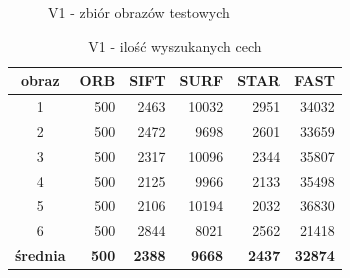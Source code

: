 \begin{figure}[!htb]
\begin{center}
{}
\caption{V1 - zbiór obrazów testowych}
\label{fig:v1_set}
\end{center}
\end{figure}



\begin{table}[htbp]
  \centering
  \caption{V1 - ilość wyszukanych cech}
    \begin{tabular}{|c|r|r|r|r|r|}\hline
    
    obraz & \textbf{ORB} & \textbf{SIFT} & \textbf{SURF} & \textbf{STAR} & \textbf{FAST} \\\hline
    
  
    1 & 500 & 2463 & 10032 & 2951 & 34032 \\
    2 & 500 & 2472 & 9698 & 2601 & 33659 \\
    3 & 500 & 2317 & 10096 & 2344 & 35807 \\
    4 & 500 & 2125 & 9966 & 2133 & 35498 \\
    5 & 500 & 2106 & 10194 & 2032 & 36830 \\
    6 & 500 & 2844 & 8021 & 2562 & 21418 \\\hline
    \textbf{średnia} & \textbf{500} & \textbf{2388} & \textbf{9668} & \textbf{2437} & \textbf{32874} \\
    \hline
    \end{tabular}%
  \label{tab:v1_f1}%
\end{table}%


